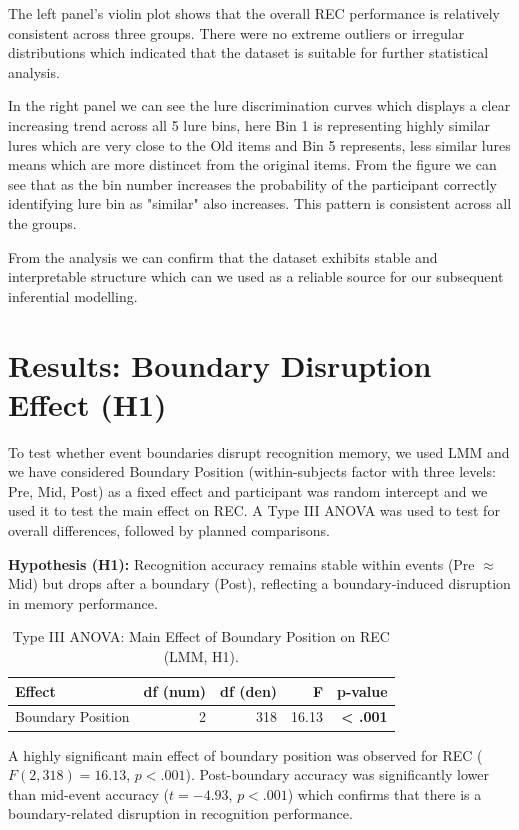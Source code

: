 \documentclass[
  12pt,
]{article}
\begin{document}
The left panel's violin plot shows that the overall REC performance is relatively consistent across three groups. There were no extreme outliers or irregular distributions which indicated that the dataset is suitable for further statistical analysis.

In the right panel we can see the lure discrimination curves which displays a clear increasing trend across all 5 lure bins, here Bin 1 is representing highly similar lures which are very close to the Old items and Bin 5 represents, less similar lures means which are more distincet from the original items. From the figure we can see that as the bin number increases the probability of the participant correctly identifying lure bin as "similar" also increases. This pattern is consistent across all the groups.

From the analysis we can confirm that the dataset exhibits stable and interpretable structure which can we used as a reliable source for our subsequent inferential modelling.

\section{Results: Boundary Disruption Effect (H1)}

To test whether event boundaries disrupt recognition memory, we used LMM and we have considered Boundary Position (within-subjects factor with three levels: Pre, Mid, Post) as a fixed effect and participant was random intercept and we used it to test the main effect on REC. A Type III ANOVA was used to test for overall differences, followed by planned comparisons.

\textbf{Hypothesis (H1):} Recognition accuracy remains stable within events (Pre $\approx$ Mid) but drops after a boundary (Post), reflecting a boundary-induced disruption in memory performance.

\begin{table}[H]
\centering
\caption{Type III ANOVA: Main Effect of Boundary Position on REC (LMM, H1).}
\begin{tabular}{lrrrr}
\toprule
Effect & df (num) & df (den) & F & p-value \\
\midrule
Boundary Position & 2 & 318 & 16.13 & \textbf{< .001} \\
\bottomrule
\end{tabular}
\end{table}

A highly significant main effect of boundary position was observed for REC ($F(2, 318) = 16.13$, $p < .001$). Post-boundary accuracy was significantly lower than mid-event accuracy ($t = -4.93$, $p < .001$) which confirms that there is a boundary-related disruption in recognition performance.
\end{document}
